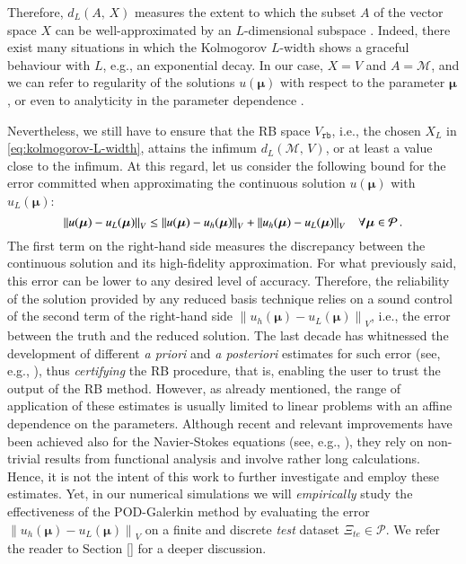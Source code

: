 \documentclass{elsarticle}
\theoremstyle{theorem}
\theoremstyle{definition}
\theoremstyle{remark}
\theoremstyle{proposition}
\numberwithin{figure}{section}
\newcommand{\norm}[1]{\left\lVert#1\right\rVert}
\newcommand{\bg}[1]{\boldsymbol{#1}}
\begin{document}
		\noindent Therefore, $d_L(A, \, X)$ measures the extent to which the subset $A$ of the vector space $X$ can be well-approximated by an $L$-dimensional subspace \cite{Mad06}. Indeed, there exist many situations in which the Kolmogorov $L$-width shows a graceful behaviour with $L$, e.g., an exponential decay. In our case, $X = V$ and $A = \mathcal{M}$, and we can refer to regularity of the solutions $u(\bg{\mu})$ with respect to the parameter $\bg{\mu}$, or even to analyticity in the parameter dependence \cite{Buf12}.
		
		Nevertheless, we still have to ensure that the RB space $V_{\texttt{rb}}$, i.e., the chosen $X_L$ in \eqref{eq:kolmogorov-L-width}, attains the infimum $d_L(\mathcal{M}, \, V)$, or at least a value close to the infimum. At this regard, let us consider the following bound for the error committed when approximating the continuous solution $u(\bg{\mu})$ with $u_L(\bg{\mu})$:
		\begin{equation*}
			\norm{u(\bg{\mu}) - u_L(\bg{\mu})}_V \leq \norm{u(\bg{\mu}) - u_h(\bg{\mu})}_V + \norm{u_h(\bg{\mu}) - u_L(\bg{\mu})}_V \hspace*{0.3cm} \forall \bg{\mu} \in \mathcal{P} \, .
		\end{equation*}
		The first term on the right-hand side measures the discrepancy between the continuous solution and its high-fidelity approximation. For what previously said, this error can be lower to any desired level of accuracy. Therefore, the reliability of the solution provided by any reduced basis technique relies on a sound control of the second term of the right-hand side $\norm{u_h(\bg{\mu}) - u_L(\bg{\mu})}_V$, i.e., the error between the truth and the reduced solution. The last decade has whitnessed the development of different \emph{a priori} and \emph{a posteriori} estimates for such error (see, e.g., \cite{Buf12, HSR16, Mad06}), thus \emph{certifying} the RB procedure, that is, enabling the user to trust the output of the RB method. However, as already mentioned, the range of application of these estimates is usually limited to linear problems with an affine dependence on the parameters. Although recent and relevant improvements have been achieved also for the Navier-Stokes equations (see, e.g., \cite{Dep08, QMN15}), they rely on non-trivial results from functional analysis and involve rather long calculations. Hence, it is not the intent of this work to further investigate and employ these estimates. Yet, in our numerical simulations we will \emph{empirically} study the effectiveness of the POD-Galerkin method by evaluating the error $\norm{u_h(\bg{\mu}) - u_L(\bg{\mu})}_V$ on a finite and discrete \emph{test} dataset $\Xi_{te} \in \mathcal{P}$. We refer the reader to Section \ref{} for a deeper discussion.
		
\end{document}
